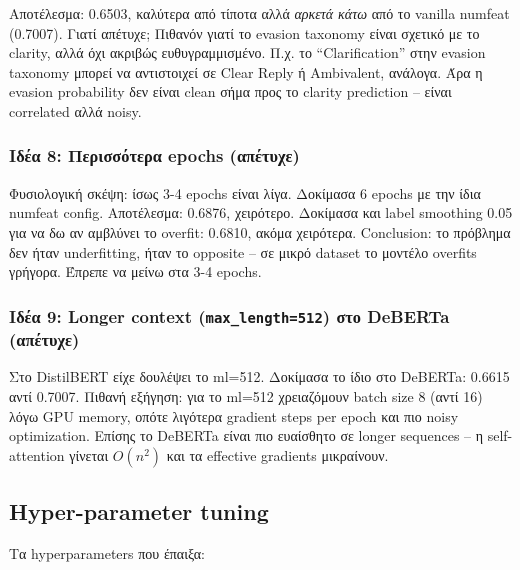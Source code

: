 \documentclass[12pt]{fphw}
\begin{document}
Αποτέλεσμα: 0.6503, καλύτερα από τίποτα αλλά \emph{αρκετά κάτω} από το vanilla numfeat (0.7007). Γιατί απέτυχε; Πιθανόν γιατί το evasion taxonomy είναι σχετικό με το clarity, αλλά όχι ακριβώς ευθυγραμμισμένο. Π.χ. το ``Clarification'' στην evasion taxonomy μπορεί να αντιστοιχεί σε Clear Reply ή Ambivalent, ανάλογα. Άρα η evasion probability δεν είναι clean σήμα προς το clarity prediction -- είναι correlated αλλά noisy.

\subsubsection{Ιδέα 8: Περισσότερα epochs (απέτυχε)}

Φυσιολογική σκέψη: ίσως 3-4 epochs είναι λίγα. Δοκίμασα 6 epochs με την ίδια numfeat config. Αποτέλεσμα: 0.6876, χειρότερο. Δοκίμασα και label smoothing 0.05 για να δω αν αμβλύνει το overfit: 0.6810, ακόμα χειρότερα. Conclusion: το πρόβλημα δεν ήταν underfitting, ήταν το opposite -- σε μικρό dataset το μοντέλο overfits γρήγορα. Έπρεπε να μείνω στα 3-4 epochs.

\subsubsection{Ιδέα 9: Longer context (\texttt{max\_length=512}) στο DeBERTa (απέτυχε)}

Στο DistilBERT είχε δουλέψει το ml=512. Δοκίμασα το ίδιο στο DeBERTa: 0.6615 αντί 0.7007. Πιθανή εξήγηση: για το ml=512 χρειαζόμουν batch size 8 (αντί 16) λόγω GPU memory, οπότε λιγότερα gradient steps per epoch και πιο noisy optimization. Επίσης το DeBERTa είναι πιο ευαίσθητο σε longer sequences -- η self-attention γίνεται $O(n^2)$ και τα effective gradients μικραίνουν.

\subsection{Hyper-parameter tuning}

Τα hyperparameters που έπαιξα:
\end{document}
